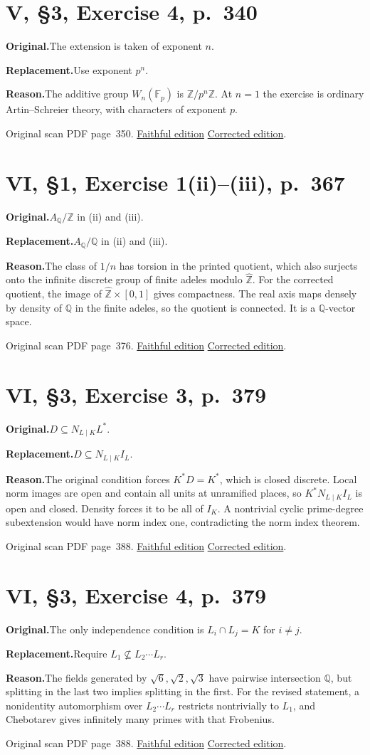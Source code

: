 \documentclass[11pt,a4paper]{article}
\newcommand{\original}{\par\smallskip\noindent\textbf{Original.}\enspace}
\newcommand{\replacement}{\par\smallskip\noindent\textbf{Replacement.}\enspace}
\newcommand{\reason}{\par\smallskip\noindent\textbf{Reason.}\enspace}
\newcommand{\editionlink}[3]{\href{#1\#errata.#2}{#3}}
\newcommand{\location}[2]{%
  \par\smallskip\noindent Original scan PDF page~#2.\enspace
  \editionlink{Neukirch_Faithful.pdf}{#1}{Faithful edition}
  \quad\editionlink{Neukirch_Corrected.pdf}{#1}{Corrected edition}.}
\begin{document}
\setcounter{section}{25}
\section{V, \S3, Exercise 4, p.~340}\label{errata:item:26}
\original The extension is taken of exponent $n$.
\replacement Use exponent $p^n$.
\reason The additive group $W_n(\mathbb F_p)$ is $\mathbb Z/p^n\mathbb Z$. At $n=1$ the exercise is ordinary Artin--Schreier theory, with characters of exponent $p$.
\location{26}{350}

\setcounter{section}{26}
\section{VI, \S1, Exercise 1(ii)--(iii), p.~367}\label{errata:item:27}
\original $A_{\mathbb Q}/\mathbb Z$ in (ii) and (iii).
\replacement $A_{\mathbb Q}/\mathbb Q$ in (ii) and (iii).
\reason The class of $1/n$ has torsion in the printed quotient, which also surjects onto the infinite discrete group of finite adeles modulo $\widehat{\mathbb Z}$. For the corrected quotient, the image of $\widehat{\mathbb Z}\times[0,1]$ gives compactness. The real axis maps densely by density of $\mathbb Q$ in the finite adeles, so the quotient is connected. It is a $\mathbb Q$-vector space.
\location{27}{376}

\setcounter{section}{27}
\section{VI, \S3, Exercise 3, p.~379}\label{errata:item:28}
\original $D\subseteq N_{L\mid K}L^*$.
\replacement $D\subseteq N_{L\mid K}I_L$.
\reason The original condition forces $K^*D=K^*$, which is closed discrete. Local norm images are open and contain all units at unramified places, so $K^*N_{L\mid K}I_L$ is open and closed. Density forces it to be all of $I_K$. A nontrivial cyclic prime-degree subextension would have norm index one, contradicting the norm index theorem.
\location{28}{388}

\setcounter{section}{28}
\section{VI, \S3, Exercise 4, p.~379}\label{errata:item:29}
\original The only independence condition is $L_i\cap L_j=K$ for $i\ne j$.
\replacement Require $L_1\not\subseteq L_2\cdots L_r$.
\reason The fields generated by $\sqrt6,\sqrt2,\sqrt3$ have pairwise intersection $\mathbb Q$, but splitting in the last two implies splitting in the first. For the revised statement, a nonidentity automorphism over $L_2\cdots L_r$ restricts nontrivially to $L_1$, and Chebotarev gives infinitely many primes with that Frobenius.
\location{29}{388}
\end{document}

